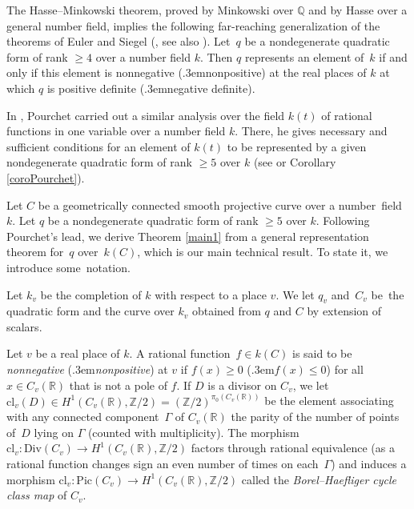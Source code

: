 \documentclass{amsart}
\theoremstyle{definition}
\theoremstyle{remark}
\numberwithin{equation}{section}
\newcommand{\cl}{\mathrm{cl}}
\newcommand{\Div}{\mathrm{Div}}
\newcommand{\Pic}{\mathrm{Pic}}
\def\resp {\text{resp.}\kern.3em}
\def\Z{\mathbb Z}
\def\Q{\mathbb Q}
\def\R{\mathbb R}
\begin{document}
 The Hasse--Minkowski theorem, proved by Minkowski over $\Q$ and by Hasse over a general number field, implies the following far-reaching generalization of the theorems of Euler and Siegel (\cite[Satz 19]{Hasse}, see also \cite[I.3.5 and VI.3.5]{Lam}).
Let~$q$ be a nondegenerate quadratic form of rank $\geq 4$ over a number field $k$. Then $q$ represents an element of~$k$ if and only if this element is nonnegative (\resp nonpositive) at the real places of $k$ at which $q$ is positive definite (\resp negative definite).

In \cite{Pourchet}, Pourchet carried out  a similar analysis over the field $k(t)$ of rational functions in one variable over a number field $k$. There, he gives necessary and sufficient conditions for an element of $k(t)$ to be represented by a given nondegenerate quadratic form of rank $\geq 5$ over $k$ (see \cite[Corollaire 1 p.\,98]
{Pourchet} or Corollary \ref{coroPourchet}).

\vspace{1em}

Let $C$ be a geometrically connected smooth projective curve over a number~field~$k$. Let $q$ be a nondegenerate quadratic form of rank $\geq 5$ over $k$. Following Pourchet's lead, we derive Theorem \ref{main1} from a
general representation theorem for~$q$ over~$k(C)$, which is our main technical result. To state it, we introduce some~notation.

Let $k_v$ be the completion of $k$ with respect to a place $v$. We let $q_v$ and~$C_v$ be~the quadratic form and the curve over $k_v$ obtained from $q$ and $C$ by extension of scalars.

Let $v$ be a real place of $k$. A rational function~$f\in k(C)$ is said to be \textit{nonnegative} (\resp \textit{nonpositive}) at $v$ if $f(x)\geq 0$ (\resp ${f(x)\leq 0}$) for all~${x\in C_v(\R)}$ that is not a pole of $f$. If $D$ is a divisor on $C_v$, we let $\cl_v(D)\in H^1(C_v(\R),\Z/2)=(\Z/2)^{\pi_0(C_v(\R))}$ be the element associating with any connected component~$\Gamma$ of $C_v(\R)$ the parity of the number of points of~$D$ lying on $\Gamma$ (counted with multiplicity). The morphism $\cl_v:\Div(C_v)\to H^1(C_v(\R),\Z/2)$ factors through rational equivalence (as a rational function changes sign an even number of times on each~$\Gamma$) and induces a morphism $\cl_v:\Pic(C_v)\to H^1(C_v(\R),\Z/2)$ called the \textit{Borel--Haefliger cycle class map} of $C_v$.
\end{document}
